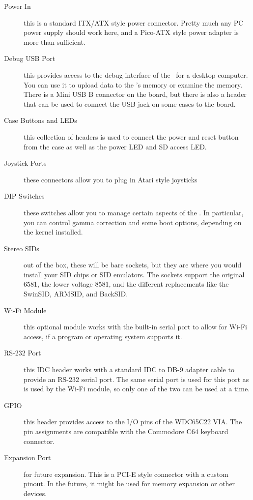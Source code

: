 \begin{description}
    \item[Power In] this is a standard ITX/ATX style power connector. Pretty much any PC power supply should work here, and a Pico-ATX style power adapter is more than sufficient.

    \item[Debug USB Port] this provides access to the debug interface of the \jr\ for a desktop computer. You can use it to upload data to the \jr's memory or examine the memory. There is a Mini USB B connector on the board, but there is also a header that can be used to connect the USB jack on some cases to the board.

    \item[Case Buttons and LEDs] this collection of headers is used to connect the power and reset button from the case as well as the power LED and SD access LED.

    \item[Joystick Ports] these connectors allow you to plug in Atari style joysticks

    \item[DIP Switches] these switches allow you to manage certain aspects of the \jr. In particular, you can control gamma correction and some boot options, depending on the kernel installed.

    \item[Stereo SIDs] out of the box, these will be bare sockets, but they are where you would install your SID chips or SID emulators. The sockets support the original 6581, the lower voltage 8581, and the different replacements like the SwinSID, ARMSID, and BackSID.

    \item[Wi-Fi Module] this optional module works with the built-in serial port to allow for Wi-Fi access, if a program or operating system supports it.

    \item[RS-232 Port] this IDC header works with a standard IDC to DB-9 adapter cable to provide an RS-232 serial port. The same serial port is used for this port as is used by the Wi-Fi module, so only one of the two can be used at a time.

    \item[GPIO] this header provides access to the I/O pins of the WDC65C22 VIA. The pin assignments are compatible with the Commodore C64 keyboard connector.

    \item[Expansion Port] for future expansion. This is a PCI-E style connector with a custom pinout. In the future, it might be used for memory expansion or other devices.


\end{description}
